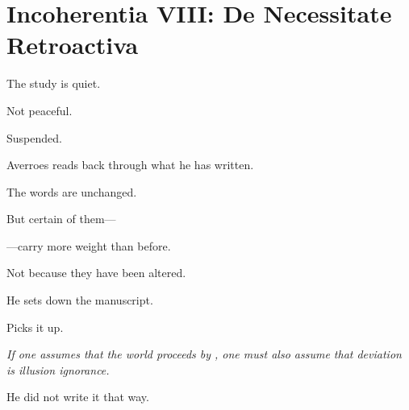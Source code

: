
\chapter*{Incoherentia VIII: De Necessitate Retroactiva}


The study is quiet.

Not peaceful.

Suspended.

\medskip

Averroes reads back through what he has written.

The words are unchanged.

\medskip

But certain of them---

\medskip

---carry more weight than before.

\medskip

Not because they have been altered.

\medskip


\medskip

He sets down the manuscript.

\medskip

Picks it up.

\medskip

\textit{If one assumes that the world proceeds by ,
 one must also assume that deviation is  illusion
 ignorance.}

\medskip

He did not write it that way.

